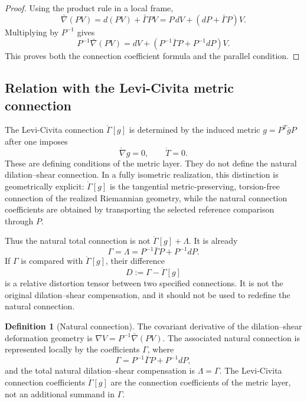 \documentclass[12pt]{amsart}
\theoremstyle{definition}
\newtheorem{definition}[theorem]{Definition}
\theoremstyle{remark}
\begin{document}
\begin{proof}
Using the product rule in a local frame,
\[
 \bar\nabla(PV)=d(PV)+\bar\Gamma PV
             =P\,dV+(dP+\bar\Gamma P)V.
\]
Multiplying by \(P^{-1}\) gives
\[
 P^{-1}\bar\nabla(PV)
 =dV+\left(P^{-1}\bar\Gamma P+P^{-1}dP\right)V.
\]
This proves both the connection coefficient formula and the parallel condition.
\end{proof}

\subsection{Relation with the Levi-Civita metric connection}\label{subsec:natural_total_comparison_principle}

The Levi-Civita connection \(\mathring\Gamma[g]\) is determined by the induced metric \(g=P^T\bar gP\) after one imposes
\[
 \mathring\nabla g=0,
 \qquad
 \mathring T=0.
\]
These are defining conditions of the metric layer.  They do not define the natural dilation--shear connection.  In a fully isometric realization, this distinction is geometrically explicit: \(\mathring\Gamma[g]\) is the tangential metric-preserving, torsion-free connection of the realized Riemannian geometry, while the natural connection coefficients are obtained by transporting the selected reference comparison through \(P\).

Thus the natural total connection is not \(\mathring\Gamma[g]+\Lambda\).  It is already
\[
 \Gamma=\Lambda=P^{-1}\bar\Gamma P+P^{-1}dP .
\]
If \(\Gamma\) is compared with \(\mathring\Gamma[g]\), their difference
\begin{equation}\label{eq:relative_distortion_only}
 D:=\Gamma-\mathring\Gamma[g]
\end{equation}
is a relative distortion tensor between two specified connections.  It is not the original dilation--shear compensation, and it should not be used to redefine the natural connection.

\begin{definition}[Natural connection]\label{def:total_connection_new_logic}
The covariant derivative of the dilation--shear deformation geometry is \(\nabla V=P^{-1}\bar\nabla(PV)\).  The associated natural connection is represented locally by the coefficients \(\Gamma\), where
\[
 \Gamma=P^{-1}\bar\Gamma P+P^{-1}dP,
\]
and the total natural dilation--shear compensation is \(\Lambda=\Gamma\).  The Levi-Civita connection coefficients \(\mathring\Gamma[g]\) are the connection coefficients of the metric layer, not an additional summand in \(\Gamma\).
\end{definition}
\end{document}

